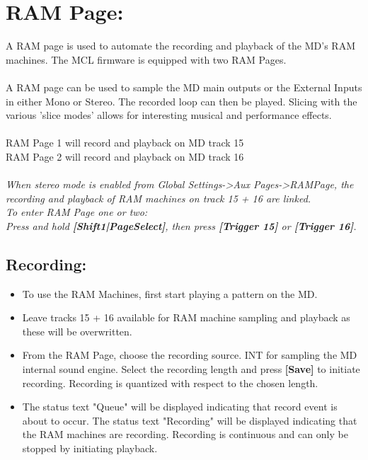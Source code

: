 \chapter{RAM Page:}
A RAM page is used to automate the recording and playback of the MD's RAM machines. The MCL firmware is equipped with two RAM Pages.
\\\\
A RAM page can be used to sample the MD main outputs or the External Inputs in either Mono or Stereo. The recorded loop can then be played.
Slicing with the various 'slice modes' allows for interesting musical and performance effects.
\\\\
RAM Page 1 will record and playback on MD track 15\\
RAM Page 2 will record and playback on MD track 16\\
\\
\textit{When stereo mode is enabled from Global Settings->Aux Pages->RAMPage, the recording and playback of RAM machines on track 15 + 16 are linked.}
\\
\textit{To enter RAM Page one or two: \\Press and hold
\textbf{[Shift1|PageSelect]}, then press \textbf{[Trigger 15]} or \textbf{[Trigger 16]}.}

\newpage
\section{Recording:}
\begin{itemize}
    \item{To use the RAM Machines, first start playing a pattern on the MD.}
    \item{Leave tracks 15 + 16 available for RAM machine sampling and playback as these will be overwritten.}
    \item{From the RAM Page, choose the recording source. INT for sampling the MD internal sound engine. Select the recording length and press \textbf{[Save]} to initiate recording. Recording is quantized with respect to the chosen length.}
    \item The status text "Queue" will be displayed indicating that record event is about to occur. The status text "Recording" will be displayed indicating that the RAM machines are recording. Recording is continuous and can only be stopped by initiating playback.
\end{itemize}

